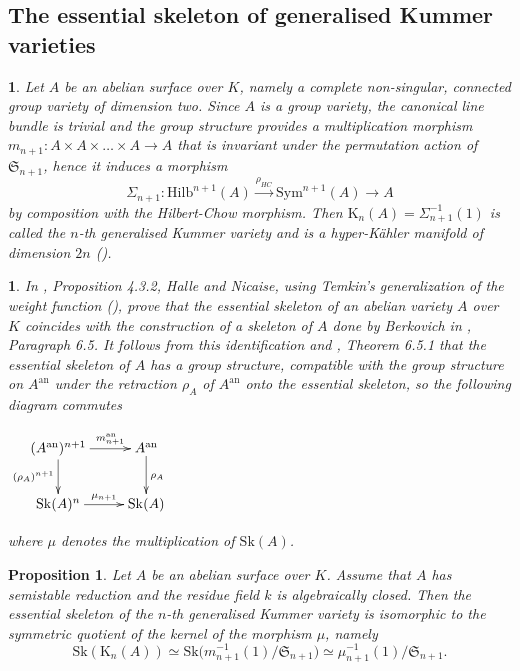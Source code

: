 \documentclass{amsart}%
\numberwithin{equation}{subsection}
\theoremstyle{plain2}
\newtheorem{prop}[equation]{Proposition}
\theoremstyle{definition2}
\theoremstyle{stepstyle}
\theoremstyle{point}
\theoremstyle{subpoint}
\newtheorem{subpoint}[equation]{}%
\newcommand{\spa}[1]{\begin{subpoint}#1\end{subpoint}}           %
\newcommand{\Hilb}{\ensuremath{\mathrm{Hilb}}}
\newcommand{\an}{\mathrm{an}}
\newcommand{\Sk}{\mathrm{Sk}}
\begin{document}
\subsection{The essential skeleton of generalised Kummer varieties} \label{sect essential sk Kummer}
\spa{Let $A$ be an abelian surface over $K$, namely a complete non-singular, connected group variety of dimension two. Since $A$ is a group variety, the canonical line bundle is trivial and the group structure provides a multiplication morphism $m_{n+1}: A \times A \times \ldots \times A \rightarrow A$ that is invariant under the permutation action of $\mathfrak{S}_{n+1}$, hence it induces a morphism $$\Sigma_{n+1}: \Hilb^{n+1}(A) \xrightarrow{\rho_{HC}} \text{Sym}^{n+1}(A) \rightarrow A$$ by composition with the Hilbert-Chow morphism. Then $\text{K}_n(A) = \Sigma_{n+1}^{-1}(1)$ is called the $n$-th generalised Kummer variety and is a hyper-K\"{a}hler manifold of dimension $2n$ (\cite{Beauville1983}).
}
\spa{In \cite{HalvardHalleNicaise2017}, Proposition 4.3.2, Halle and Nicaise, using Temkin's generalization of the weight function (\cite{Temkina}), prove that the essential skeleton of an abelian variety $A$ over $K$ coincides with the construction of a skeleton of $A$ done by Berkovich in \cite{Berkovich1990}, Paragraph 6.5. It follows from this identification and \cite{Berkovich1990}, Theorem 6.5.1 that the essential skeleton of $A$ has a group structure, compatible with the group structure on $A^\an$ under the retraction $\rho_A$ of $A^\an$ onto the essential skeleton, so the following diagram commutes
\begin{center}
$\xymatrix{
(A^\an)^{n+1} \ar[d]_{(\rho_A)^{n+1}} \ar[r]^-{m_{n+1}^\an} & A^\an \ar[d]^{\rho_A} \\
\Sk(A)^n \ar[r]^-{\mu_{n+1}} & \Sk(A)
}$
\end{center} where $\mu$ denotes the multiplication of $\Sk(A)$.
}
\begin{prop} \label{prop essential skeleton Kummer}
Let $A$ be an abelian surface over $K$. Assume that $A$ has  semistable reduction and the residue field $k$ is algebraically closed. Then the essential skeleton of the $n$-th generalised Kummer variety is isomorphic to the symmetric quotient of the kernel of the morphism $\mu$, namely $$\Sk(\text{K}_n(A)) \simeq \Sk\big(m_{n+1}^{-1}(1)/\mathfrak{S}_{n+1}\big) \simeq \mu_{n+1}^{-1}(1)/\mathfrak{S}_{n+1}.$$ 
\end{prop}
\end{document}
